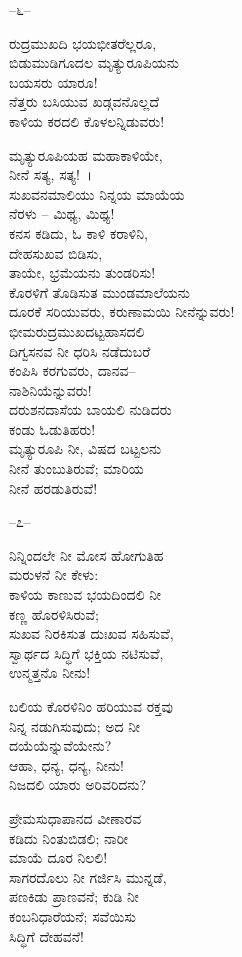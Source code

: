 \begin{center}
–೬–
\end{center}

ರುದ್ರಮುಖದಿ ಭಯಭೀತರೆಲ್ಲರೂ,\\ಬಿಡುಮುಡಿಗೂದಲ ಮೃತ್ಯುರೂಪಿಯನು\\ಬಯಸರು ಯಾರೂ!\\ನೆತ್ತರು ಬಸಿಯುವ ಖಡ್ಗವನೊಲ್ಲದೆ\\ಕಾಳಿಯ ಕರದಲಿ ಕೊಳಲನ್ನಿಡುವರು!

ಮೃತ್ಯುರೂಪಿಯಹ ಮಹಾಕಾಳಿಯೇ,\\ನೀನೆ ಸತ್ಯ, ಸತ್ಯ!~।\\ಸುಖವನಮಾಲಿಯು ನಿನ್ನಯ ಮಾಯೆಯ\\ನೆರಳು – ಮಿಥ್ಯ, ಮಿಥ್ಯ!\\ಕನಸ ಕಡಿದು, ಓ ಕಾಳಿ ಕರಾಳಿನಿ,\\ದೇಹಸುಖವ ಬಿಡಿಸು,\\ತಾಯೇ, ಭ್ರಮೆಯನು ತುಂಡರಿಸು!\\ಕೊರಳಿಗೆ ತೊಡಿಸುತ ಮುಂಡಮಾಲೆಯನು\\ದೂರಕೆ ಸರಿಯುವರು, ಕರುಣಾಮಯಿ ನೀನೆನ್ನುವರು!\\ಭೀಮರುದ್ರಮುಖದಟ್ಟಹಾಸದಲಿ\\ದಿಗ್ವಸನವ ನೀ ಧರಿಸಿ ನಡೆದುಬರೆ\\ಕಂಪಿಸಿ ಕರಗುವರು, ದಾನವ–\\ನಾಶಿನಿಯೆನ್ನುವರು!\\ದರುಶನದಾಸೆಯ ಬಾಯಲಿ ನುಡಿದರು\\ಕಂಡು ಓಡುತಿಹರು!\\ಮೃತ್ಯುರೂಪಿ ನೀ, ವಿಷದ ಬಟ್ಟಲನು\\ನೀನೆ ತುಂಬುತಿರುವೆ; ಮಾರಿಯ\\ನೀನೆ ಹರಡುತಿರುವೆ!

\begin{center}
–೭–
\end{center}

ನಿನ್ನಿಂದಲೇ ನೀ ಮೋಸ ಹೋಗುತಿಹ\\ಮರುಳನೆ ನೀ ಕೇಳು:\\ಕಾಳಿಯ ಕಾಣುವ ಭಯದಿಂದಲಿ ನೀ\\ಕಣ್ಣ ಹೊರಳಿಸಿರುವೆ;\\ಸುಖವ ನಿರಕಿಸುತ ದುಃಖವ ಸಹಿಸುವೆ,\\ಸ್ವಾರ್ಥದ ಸಿದ್ಧಿಗೆ ಭಕ್ತಿಯ ನಟಿಸುವೆ,\\ಉನ್ಮತ್ತನೊ ನೀನು!

ಬಲಿಯ ಕೊರಳಿನಿಂ ಹರಿಯುವ ರಕ್ತವು\\ನಿನ್ನ ನಡುಗಿಸುವುದು; ಅದ ನೀ\\ದಯೆಯೆನ್ನುವೆಯೇನು?\\ಆಹಾ, ಧನ್ಯ, ಧನ್ಯ, ನೀನು!\\
 ನಿಜದಲಿ ಯಾರು ಅರಿವರಿದನು?

ಪ್ರೇಮಸುಧಾಪಾನದ ವೀಣಾರವ\\ಕಡಿದು ನಿಂತುಬಿಡಲಿ; ನಾರೀ\\ಮಾಯೆ ದೂರ ನಿಲಲಿ!\\ಸಾಗರದೊಲು ನೀ ಗರ್ಜಿಸಿ ಮುನ್ನಡೆ,\\ಪಣಕಿಡು ಪ್ರಾಣವನೆ; ಕುಡಿ ನೀ\\ಕಂಬನಿಧಾರೆಯನೆ; ಸವೆಯಿಸು\\ಸಿದ್ಧಿಗೆ ದೇಹವನೆ!

